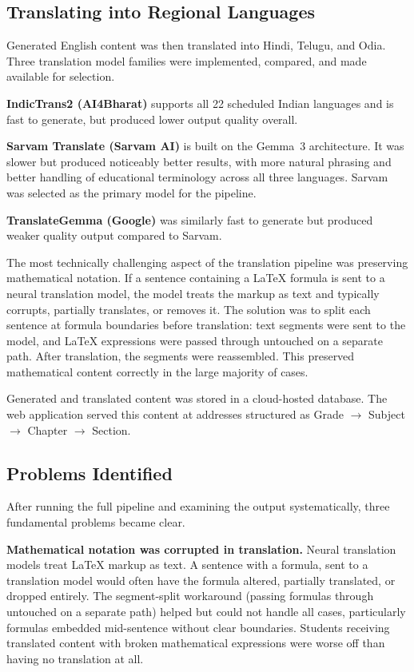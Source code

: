 \documentclass[12pt,a4paper]{article}
\begin{document}
\subsection{Translating into Regional Languages}

Generated English content was then translated into Hindi, Telugu, and Odia.
Three translation model families were implemented, compared, and made available
for selection.

\medskip
\noindent\textbf{IndicTrans2 (AI4Bharat)} supports all 22 scheduled Indian languages
and is fast to generate, but produced lower output quality overall.

\medskip
\noindent\textbf{Sarvam Translate (Sarvam AI)} is built on the Gemma~3 architecture.
It was slower but produced noticeably better results, with more natural phrasing
and better handling of educational terminology across all three languages.
Sarvam was selected as the primary model for the pipeline.

\medskip
\noindent\textbf{TranslateGemma (Google)} was similarly fast to generate
but produced weaker quality output compared to Sarvam.

\medskip
The most technically challenging aspect of the translation pipeline was preserving
mathematical notation.
If a sentence containing a \LaTeX{} formula is sent to a neural translation model,
the model treats the markup as text and typically corrupts, partially translates,
or removes it.
The solution was to split each sentence at formula boundaries before translation:
text segments were sent to the model, and \LaTeX{} expressions were passed through
untouched on a separate path.
After translation, the segments were reassembled.
This preserved mathematical content correctly in the large majority of cases.

Generated and translated content was stored in a cloud-hosted database.
The web application served this content at addresses structured as
Grade $\rightarrow$ Subject $\rightarrow$ Chapter $\rightarrow$ Section.

\subsection{Problems Identified}

After running the full pipeline and examining the output systematically,
three fundamental problems became clear.

\medskip
\noindent\textbf{Mathematical notation was corrupted in translation.}
Neural translation models treat \LaTeX{} markup as text.
A sentence with a formula, sent to a translation model
would often have the formula altered, partially translated, or dropped entirely.
The segment-split workaround (passing formulas through untouched on a separate path)
helped but could not handle all cases, particularly formulas embedded mid-sentence
without clear boundaries.
Students receiving translated content with broken mathematical expressions
were worse off than having no translation at all.
\end{document}
